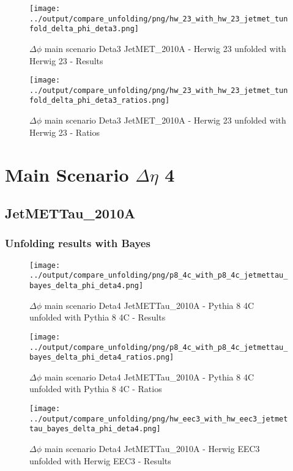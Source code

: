 \documentclass[11pt]{book}
\begin{document}
\begin{figure}[ht]
\centering
\texttt{[image: ../output/compare\_unfolding/png/hw\_23\_with\_hw\_23\_jetmet\_tunfold\_delta\_phi\_deta3.png]}
\caption{$\Delta\phi$ main scenario Deta3 JetMET\_2010A - Herwig 23 unfolded with Herwig 23 - Results}
\label{hw_23_hw_23_jetmet_tunfold_delta_phi_deta3_a}
\end{figure}

\begin{figure}[ht]
\centering
\texttt{[image: ../output/compare\_unfolding/png/hw\_23\_with\_hw\_23\_jetmet\_tunfold\_delta\_phi\_deta3\_ratios.png]}
\caption{$\Delta\phi$ main scenario Deta3 JetMET\_2010A - Herwig 23 unfolded with Herwig 23 - Ratios}
\label{hw_23_hw_23_jetmet_tunfold_delta_phi_deta3_b}
\end{figure}



\newpage
\chapter{Main Scenario $\Delta\eta$ 4 }
\section{JetMETTau\_2010A}
\subsection{Unfolding results with Bayes}

\begin{figure}[ht]
\centering
\texttt{[image: ../output/compare\_unfolding/png/p8\_4c\_with\_p8\_4c\_jetmettau\_bayes\_delta\_phi\_deta4.png]}
\caption{$\Delta\phi$ main scenario Deta4 JetMETTau\_2010A - Pythia 8 4C unfolded with Pythia 8 4C - Results}
\label{p8_p8_jetmettau_bayes_delta_phi_deta4_a}
\end{figure}

\begin{figure}[ht]
\centering
\texttt{[image: ../output/compare\_unfolding/png/p8\_4c\_with\_p8\_4c\_jetmettau\_bayes\_delta\_phi\_deta4\_ratios.png]}
\caption{$\Delta\phi$ main scenario Deta4 JetMETTau\_2010A - Pythia 8 4C unfolded with Pythia 8 4C - Ratios}
\label{p8_p8_jetmettau_bayes_delta_phi_deta4_b}
\end{figure}

\begin{figure}[ht]
\centering
\texttt{[image: ../output/compare\_unfolding/png/hw\_eec3\_with\_hw\_eec3\_jetmettau\_bayes\_delta\_phi\_deta4.png]}
\caption{$\Delta\phi$ main scenario Deta4 JetMETTau\_2010A - Herwig EEC3 unfolded with Herwig EEC3 - Results}
\label{hw_eec3_hw_eec3_jetmettau_bayes_delta_phi_deta4_a}
\end{figure}
\end{document}
